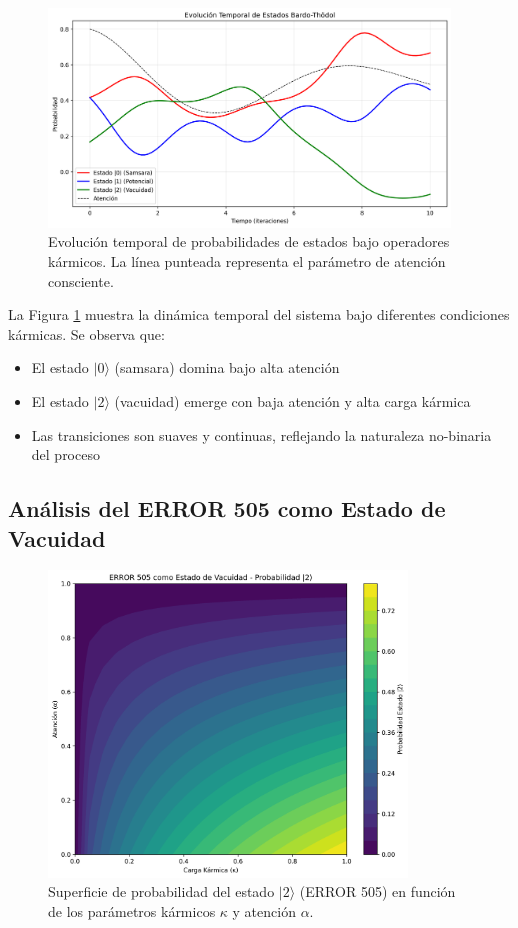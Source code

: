 \documentclass[12pt,a4paper]{article}
\newcommand{\ket}[1]{| #1 \rangle}
\theoremstyle{definition}
\begin{document}
\begin{figure}[htbp]
\centering
\includegraphics[width=0.95\textwidth]{graphics/generated/state_evolution.png}
\caption{Evolución temporal de probabilidades de estados bajo operadores kármicos. La línea punteada representa el parámetro de atención consciente.}
\label{fig:state_evolution}
\end{figure}

La Figura \ref{fig:state_evolution} muestra la dinámica temporal del sistema bajo diferentes condiciones kármicas. Se observa que:

\begin{itemize}
    \item El estado $\ket{0}$ (samsara) domina bajo alta atención
    \item El estado $\ket{2}$ (vacuidad) emerge con baja atención y alta carga kármica
    \item Las transiciones son suaves y continuas, reflejando la naturaleza no-binaria del proceso
\end{itemize}

\subsection{Análisis del ERROR 505 como Estado de Vacuidad}

\begin{figure}[htbp]
\centering
\includegraphics[width=0.85\textwidth]{graphics/generated/error505_analysis.png}
\caption{Superficie de probabilidad del estado $\ket{2}$ (ERROR 505) en función de los parámetros kármicos $\kappa$ y atención $\alpha$.}
\label{fig:error505_analysis}
\end{figure}
\end{document}
